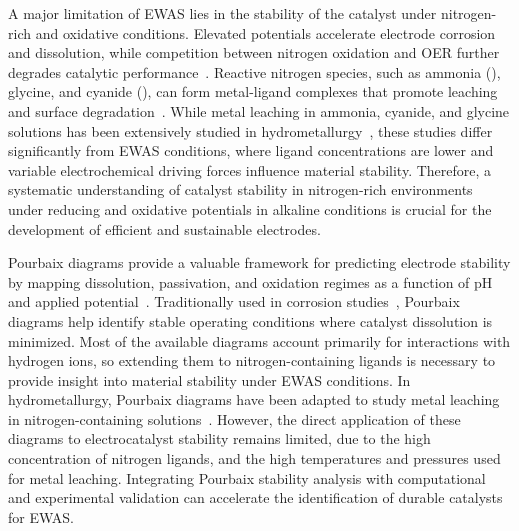 A major limitation of EWAS lies in the stability of the catalyst under nitrogen-rich and oxidative conditions. Elevated potentials accelerate electrode corrosion and dissolution\cite{Sanchis2022NitrateOverview,Popov2015ThermodynamicsCorrosion,Kapaka2010ElectrochemicalElectrode,Mucalo2004InSolutions,Aksu2001ElectrochemistrySolutions,OConnor2018ElectrochemicalSolutions}, while competition between nitrogen oxidation and OER further degrades catalytic performance~\cite{Li2021Ru-DopedNitrate,Wang2022ElectrochemicalOxidation,Dai2020ElectrochemicalOxides}. Reactive nitrogen species, such as ammonia (), glycine, and cyanide (), can form metal-ligand complexes that promote leaching and surface degradation~\cite{Bjerrum1957StabilitySubstances,Meng1996PrinciplesReview,Wang2022AmmoniaSystem}. While metal leaching in ammonia, cyanide, and glycine solutions has been extensively studied in hydrometallurgy~\cite{Meng1996PrinciplesReview,Wang2022AmmoniaSystem,Han1974AMMONIA-AMMONIUMNODULES,Bhuntumkomol1982TheSolutions,Azadi2021SustainableGlycine,Oraby2020GoldPermanganate,Sarvar2023ApplicationStructure,SPARROW1995CyanideApplications,Akcil2015PreciousReview}, these studies differ significantly from EWAS conditions, where ligand concentrations are lower and variable electrochemical driving forces influence material stability. Therefore, a systematic understanding of catalyst stability in nitrogen-rich environments under reducing and oxidative potentials in alkaline conditions is crucial for the development of efficient and sustainable electrodes.

Pourbaix diagrams provide a valuable framework for predicting electrode stability by mapping dissolution, passivation, and oxidation regimes as a function of pH and applied potential~\cite{PourbaixAtlasSolutions}. Traditionally used in corrosion studies~\cite{McCafferty2010ThermodynamicsDiagrams, Stack2005BridgingDiagrams,Pourbaix1973LecturesCorrosion}, Pourbaix diagrams help identify stable operating conditions where catalyst dissolution is minimized. Most of the available diagrams account primarily for interactions with hydrogen ions\cite{Huang2017ImprovedCompounds,Wang2020PredictingFunctional,Huang2015ElectrochemicalCalculations,Cao2020E-pHLaterite}, so extending them to nitrogen-containing ligands is necessary to provide insight into material stability under EWAS conditions. In hydrometallurgy, Pourbaix diagrams have been adapted to study metal leaching in nitrogen-containing solutions~\cite{Meng1996PrinciplesReview,NasuhaYahya2019ThermodynamicDiagram,Barragan2021LeachingOptimization,OConnor2018ElectrochemicalSolutions,Seke2006EffectSphalerite}. However, the direct application of these diagrams to electrocatalyst stability remains limited, due to the high concentration of nitrogen ligands, and the high temperatures and pressures used for metal leaching. Integrating Pourbaix stability analysis with computational and experimental validation can accelerate the identification of durable catalysts for EWAS.

